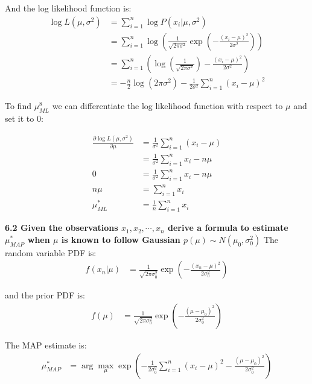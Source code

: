 \documentclass{article}
\begin{document}
And the log likelihood function is:
\begin{align*}
    \log L(\mu, \sigma^2) &= \sum_{i=1}^{n} \log P(x_i|\mu, \sigma^2) \\
    &= \sum_{i=1}^{n} \log \left(\frac{1}{\sqrt{2\pi\sigma^2}} \exp\left(-\frac{(x_i - \mu)^2}{2\sigma^2}\right)\right) \\
    &= \sum_{i=1}^{n} \left(\log \left(\frac{1}{\sqrt{2\pi\sigma^2}}\right) - \frac{(x_i - \mu)^2}{2\sigma^2}\right) \\
    &= -\frac{n}{2} \log(2\pi\sigma^2) - \frac{1}{2\sigma^2} \sum_{i=1}^{n} (x_i - \mu)^2
\end{align*}

To find $\mu^8_{ML}$ we can differentiate the log likelihood function with respect to $\mu$ and set it to 0:

\begin{align*}
    \frac{\partial \log L(\mu, \sigma^2)}{\partial \mu} &= \frac{1}{\sigma^2} \sum_{i=1}^{n} (x_i - \mu) \\
    &= \frac{1}{\sigma^2} \sum_{i=1}^{n} x_i - n\mu \\
    0 &= \frac{1}{\sigma^2} \sum_{i=1}^{n} x_i - n\mu \\
    n\mu &= \sum_{i=1}^{n} x_i \\
    \mu^*_{ML} &= \frac{1}{n} \sum_{i=1}^{n} x_i
\end{align*}

\noindent \textbf{6.2 Given the observations $x_1, x_2, \cdots, x_n$ derive a formula to estimate $\mu^*_{MAP}$ when $\mu$ is known to
follow Gaussian $p(\mu) \sim N(\mu_0,\sigma^2_0)$}\newline
The random variable PDF is:
\begin{align*}
    f(x_n|\mu) &= \frac{1}{\sqrt{2\pi\sigma^2_0}} \exp\left(-\frac{(x_n - \mu)^2}{2\sigma^2_0}\right)
\end{align*}

and the prior PDF is:
\begin{align*}
    f(\mu) &= \frac{1}{\sqrt{2\pi\sigma^2_0}} \exp\left(-\frac{(\mu - \mu_0)^2}{2\sigma^2_0}\right)
\end{align*}

The MAP estimate is:
\begin{align*}
    \mu^*_{MAP} &= \arg\max_{\mu} \exp\left(-\frac{1}{2\sigma^2_0} \sum_{i=1}^{n} (x_i - \mu)^2 -\frac{(\mu - \mu_0)^2}{2\sigma^2_0}\right) \\
\end{align*}
\end{document}
